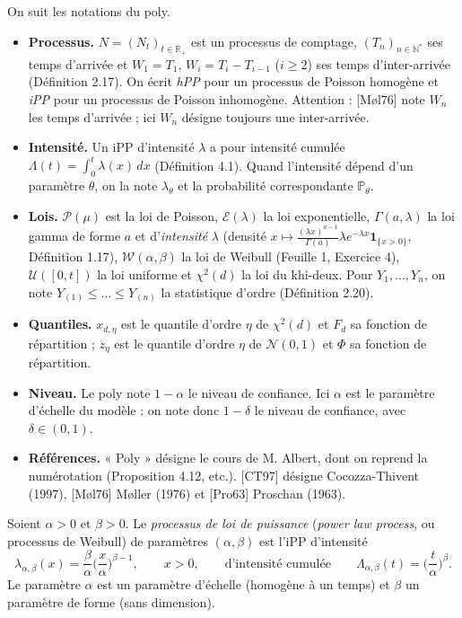On suit les notations du poly.
\begin{itemize}
\item \textbf{Processus.} $N=(N_t)_{t\in\mathbb{R}_+}$ est un processus de comptage, $(T_n)_{n\in\mathbb{N}^*}$ ses temps d'arrivée et $W_1=T_1$, $W_i=T_i-T_{i-1}$ ($i\ge2$) ses temps d'inter-arrivée (Définition 2.17). On écrit \emph{hPP} pour un processus de Poisson homogène et \emph{iPP} pour un processus de Poisson inhomogène. Attention : [Møl76] note $W_n$ les temps d'arrivée ; ici $W_n$ désigne toujours une inter-arrivée.
\item \textbf{Intensité.} Un iPP d'intensité $\lambda$ a pour intensité cumulée $\Lambda(t)=\int_0^t\lambda(x)\,dx$ (Définition 4.1). Quand l'intensité dépend d'un paramètre $\theta$, on la note $\lambda_\theta$ et la probabilité correspondante $\mathbb{P}_\theta$.
\item \textbf{Lois.} $\mathcal{P}(\mu)$ est la loi de Poisson, $\mathcal{E}(\lambda)$ la loi exponentielle, $\Gamma(a,\lambda)$ la loi gamma de forme $a$ et d'\emph{intensité} $\lambda$ (densité $x\mapsto\frac{(\lambda x)^{a-1}}{\Gamma(a)}\lambda e^{-\lambda x}\mathbf{1}_{\{x>0\}}$, Définition 1.17), $\mathcal{W}(\alpha,\beta)$ la loi de Weibull (Feuille 1, Exercice 4), $\mathcal{U}([0,t])$ la loi uniforme et $\chi^2(d)$ la loi du khi-deux. Pour $Y_1,\dots,Y_n$, on note $Y_{(1)}\le\dots\le Y_{(n)}$ la statistique d'ordre (Définition 2.20).
\item \textbf{Quantiles.} $x_{d,\eta}$ est le quantile d'ordre $\eta$ de $\chi^2(d)$ et $F_d$ sa fonction de répartition ; $z_\eta$ est le quantile d'ordre $\eta$ de $\mathcal{N}(0,1)$ et $\Phi$ sa fonction de répartition.
\item \textbf{Niveau.} Le poly note $1-\alpha$ le niveau de confiance. Ici $\alpha$ est le paramètre d'échelle du modèle : on note donc $1-\delta$ le niveau de confiance, avec $\delta\in(0,1)$.
\item \textbf{Références.} « Poly » désigne le cours de M. Albert, dont on reprend la numérotation (Proposition 4.12, etc.). [CT97] désigne Cocozza-Thivent (1997), [Møl76] Møller (1976) et [Pro63] Proschan (1963).
\end{itemize}

\begin{definition}\label{def:plp}
Soient $\alpha>0$ et $\beta>0$. Le \emph{processus de loi de puissance} (\emph{power law process}, ou processus de Weibull) de paramètres $(\alpha,\beta)$ est l'iPP d'intensité
\[
\lambda_{\alpha,\beta}(x)=\frac{\beta}{\alpha}\Big(\frac{x}{\alpha}\Big)^{\beta-1},\qquad x>0,
\qquad\text{d'intensité cumulée}\qquad
\Lambda_{\alpha,\beta}(t)=\Big(\frac{t}{\alpha}\Big)^{\beta}.
\]
Le paramètre $\alpha$ est un paramètre d'échelle (homogène à un temps) et $\beta$ un paramètre de forme (sans dimension).
\end{definition}

